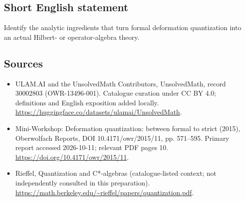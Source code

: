 \documentclass[11pt]{article}
\begin{document}
\subsection{Short English statement}
Identify the analytic ingredients that turn formal deformation quantization into an actual Hilbert- or operator-algebra theory.
\subsection{Sources}
\begin{itemize}
\item[\hypertarget{source:30002803:1}{S1}] ULAM.AI and the UnsolvedMath Contributors, UnsolvedMath, record 30002803 (OWR-13496-001). Catalogue curation under CC BY 4.0; definitions and English exposition added locally.
\url{https://huggingface.co/datasets/ulamai/UnsolvedMath}.
\item[\hypertarget{source:30002803:2}{S2}] Mini-Workshop: Deformation quantization: between formal to strict (2015), Oberwolfach Reports, DOI 10.4171/owr/2015/11, pp. 571--595. Primary report accessed 2026-10-11; relevant PDF pages 10.
\url{https://doi.org/10.4171/owr/2015/11}.
\item[\hypertarget{source:30002803:3}{S3}] Rieffel, Quantization and C*-algebras (catalogue-listed context; not independently consulted in this preparation).
\url{https://math.berkeley.edu/~rieffel/papers/quantization.pdf}.
\end{itemize}
\label{end:30002803}
\end{document}
